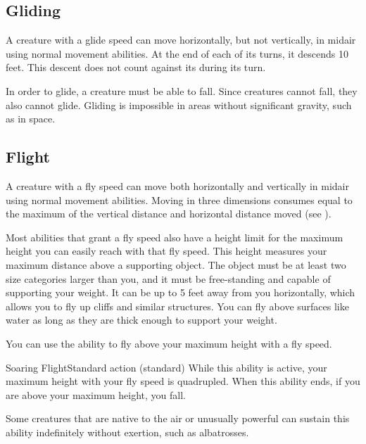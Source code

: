   \subsection{Gliding}\label{Gliding}
    A creature with a glide speed can move horizontally, but not vertically, in midair using normal movement abilities.
    At the end of each of its turns, it descends 10 feet.
    This descent does not count against its  during its turn.

    In order to glide, a creature must be able to fall.
    Since  creatures cannot fall, they also cannot glide.
    Gliding is impossible in areas without significant gravity, such as in space.

  \subsection{Flight}\label{Flight}
    A creature with a fly speed can move both horizontally and vertically in midair using normal movement abilities.
    Moving in three dimensions consumes  equal to the maximum of the vertical distance and horizontal distance moved (see ).

     Most abilities that grant a fly speed also have a height limit for the maximum height you can easily reach with that fly speed.
    This height measures your maximum distance above a supporting object.
    The object must be at least two size categories larger than you, and it must be free-standing and capable of supporting your weight.
    It can be up to 5 feet away from you horizontally, which allows you to fly up cliffs and similar structures.
    You can fly above surfaces like water as long as they are thick enough to support your weight.

    You can use the  ability to fly above your maximum height with a fly speed.

    \begin{sustainability}{Soaring Flight}{Standard action}
      \abilitytags \atSustain (standard)
      \rankline
      While this ability is active, your maximum height with your fly speed is quadrupled.
      When this ability ends, if you are above your maximum height, you fall.

      Some creatures that are native to the air or unusually powerful can sustain this ability indefinitely without exertion, such as albatrosses.
    \end{sustainability}

